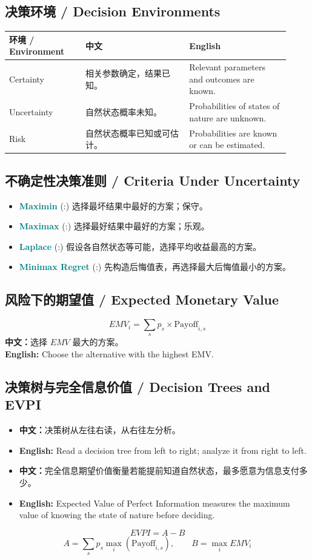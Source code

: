 \documentclass[11pt,a4paper]{ctexart}
\newcommand{\term}[2]{\textbf{\textcolor{Teal}{#1}} \textcolor{Muted}{(#2)}}
\newcommand{\cn}[1]{\textbf{中文：}#1}
\newcommand{\en}[1]{\textbf{English:} #1}
\begin{document}
\subsection{决策环境 / Decision Environments}
\begin{longtable}{L{0.25\linewidth}L{0.34\linewidth}L{0.33\linewidth}}
\toprule
\textbf{环境 / Environment} & \textbf{中文} & \textbf{English} \\
\midrule
Certainty & 相关参数确定，结果已知。 & Relevant parameters and outcomes are known. \\
Uncertainty & 自然状态概率未知。 & Probabilities of states of nature are unknown. \\
Risk & 自然状态概率已知或可估计。 & Probabilities are known or can be estimated. \\
\bottomrule
\end{longtable}

\subsection{不确定性决策准则 / Criteria Under Uncertainty}
\begin{itemize}
  \item \term{Maximin}: 选择最坏结果中最好的方案；保守。
  \item \term{Maximax}: 选择最好结果中最好的方案；乐观。
  \item \term{Laplace}: 假设各自然状态等可能，选择平均收益最高的方案。
  \item \term{Minimax Regret}: 先构造后悔值表，再选择最大后悔值最小的方案。
\end{itemize}

\subsection{风险下的期望值 / Expected Monetary Value}
\[
EMV_i=\sum_{s}p_s \times \text{Payoff}_{i,s}
\]
\cn{选择 $EMV$ 最大的方案。}\\
\en{Choose the alternative with the highest EMV.}

\subsection{决策树与完全信息价值 / Decision Trees and EVPI}
\begin{itemize}
  \item \cn{决策树从左往右读，从右往左分析。}
  \item \en{Read a decision tree from left to right; analyze it from right to left.}
  \item \cn{完全信息期望价值衡量若能提前知道自然状态，最多愿意为信息支付多少。}
  \item \en{Expected Value of Perfect Information measures the maximum value of knowing the state of nature before deciding.}
\end{itemize}
\[
EVPI=A-B
\]
\[
A=\sum_s p_s \max_i(\text{Payoff}_{i,s}), \qquad
B=\max_i EMV_i
\]
\end{document}
